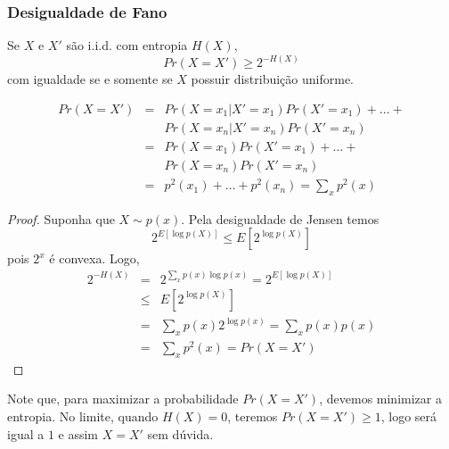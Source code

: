 \begin{frame}[allowframebreaks]
  \frametitle{Desigualdade de Fano}
  \begin{lemma}
  Se $X$ e $X'$ são i.i.d. com entropia $H(X)$,
        \begin{equation}
        Pr(X = X') \geq 2^{-H(X)}
        \end{equation}
  com igualdade se e somente se $X$ possuir distribuição uniforme.
  \end{lemma}

  \begin{eqnarray}
  Pr(X = X') &=& Pr(X=x_1|X'=x_1)Pr(X'=x_1) + \ldots + \nonumber \\ && Pr(X=x_n|X'=x_n)Pr(X'=x_n) \nonumber \\
        &=& Pr(X=x_1)Pr(X'=x_1) + \ldots + \nonumber \\ && Pr(X=x_n)Pr(X'=x_n) \nonumber \\
        &=& p^2(x_1) + \ldots + p^2(x_n) = \sum_x p^2(x)
  \end{eqnarray}

  \framebreak

  \begin{proof}
  Suponha que $X \sim p(x)$. Pela desigualdade de Jensen temos
        \begin{equation}
        2^{E[\log p(X)]} \leq E[2^{\log p(X)}]
        \end{equation}
  pois $2^x$ é convexa.
  Logo,
        \begin{eqnarray}
        2^{-H(X)} &=& 2^{\sum_x p(x) \log p(x)} = 2^{E[\log p(X)]} \nonumber \\
                &\leq& E[2^{\log p(X)}] \nonumber \\
                &=& \sum_x p(x) 2^{\log p(x)} = \sum_x p(x)p(x) \nonumber \\
                &=& \sum_x p^2(x) = Pr(X = X')
        \end{eqnarray}
  \end{proof}

  \framebreak
  
  Note que, para maximizar a probabilidade $Pr(X = X')$, devemos minimizar a entropia.
  No limite, quando $H(X)=0$, teremos $Pr(X = X') \geq 1$, logo será igual a $1$ e assim $X = X'$ sem dúvida.
\end{frame}

